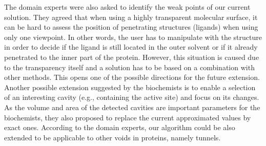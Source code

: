 The domain experts were also asked to identify the weak points of our current solution.
They agreed that when using a highly transparent molecular surface, it can be hard to assess the position of penetrating structures (ligands) when using only one viewpoint.
In other words, the user has to manipulate with the structure in order to decide if the ligand is still located in the outer solvent or if it already penetrated to the inner part of the protein.
However, this situation is caused due to the transparency itself and a solution has to be based on a combination with other methods.
This opens one of the possible directions for the future extension.
Another possible extension suggested by the biochemists is to enable a selection of an interesting cavity (e.g., containing the active site) and focus on its changes.
As the volume and area of the detected cavities are important parameters for the biochemists, they also proposed to replace the current approximated values by exact ones.
According to the domain experts, our algorithm could be also extended to be applicable to other voids in proteins, namely tunnels.



